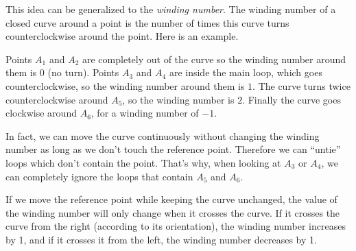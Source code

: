 This idea can be generalized to the \emph{winding number}. The winding number of a closed curve around a point is the number of times this curve turns counterclockwise around the point. Here is an example.


Points $A_1$ and $A_2$ are completely out of the curve so the winding number around them is $0$ (no turn). Points $A_3$ and $A_4$ are inside the main loop, which goes counterclockwise, so the winding number around them is $1$. The curve turns twice counterclockwise around $A_5$, so the winding number is $2$. Finally the curve goes clockwise around $A_6$, for a winding number of $-1$.

\begin{mathy}
In fact, we can move the curve continuously without changing the winding number as long as we don't touch the reference point. Therefore we can ``untie'' loops which don't contain the point. That's why, when looking at $A_3$ or $A_4$, we can completely ignore the loops that contain $A_5$ and $A_6$.
\end{mathy}

\begin{mathy}
If we move the reference point while keeping the curve unchanged, the value of the winding number will only change when it crosses the curve. If it crosses the curve from the right (according to its orientation), the winding number increases by 1, and if it crosses it from the left, the winding number decreases by 1.

\end{mathy}


